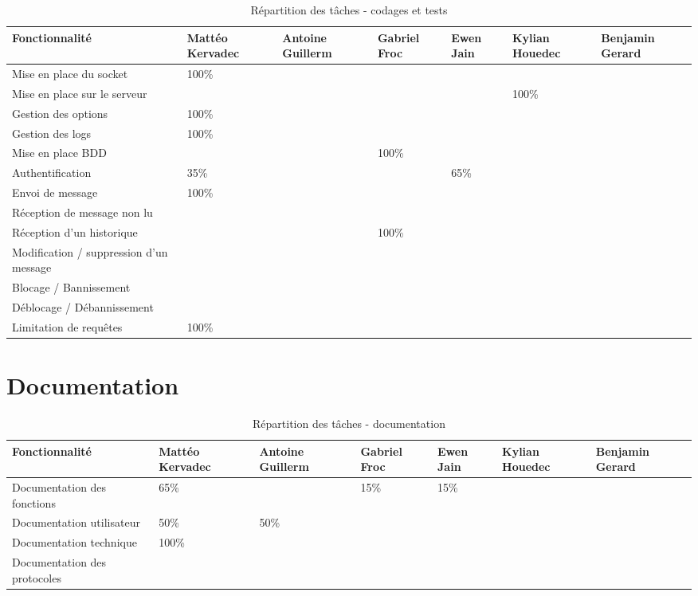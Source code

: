 \documentclass{report}
\begin{document}
\begin{table}[ht]
\hspace{-1cm}  %
\begin{tabular}{|p{3cm}|p{2cm}|p{2cm}|p{2cm}|p{2cm}|p{2cm}|p{2cm}|}
\hline
\textbf{Fonctionnalité} & \textbf{Mattéo Kervadec} & \textbf{Antoine Guillerm} & \textbf{Gabriel Froc} & \textbf{Ewen Jain} & \textbf{Kylian Houedec} & \textbf{Benjamin Gerard} \\
\hline
Mise en place du socket & 100\% & & & & & \\
\hline
Mise en place sur le serveur & & & & & 100\% & \\
\hline
Gestion des options & 100\% & & & & & \\
\hline
Gestion des logs & 100\% & & & & & \\
\hline
Mise en place BDD & & & 100\% & & & \\
\hline
Authentification & 35\% & & & 65\% & & \\
\hline
Envoi de message & 100\% & & & & & \\
\hline
Réception de message non lu & & & & & & \\
\hline
Réception d'un historique & & & 100\% & & & \\
\hline
Modification / suppression d'un message & & & & & & \\
\hline
Blocage / Bannissement & & & & & & \\
\hline
Déblocage / Débannissement &  & & & & & \\
\hline
Limitation de requêtes & 100\% & & & & & \\
\hline
\end{tabular}
\caption{Répartition des tâches - codages et tests}
\end{table}

\chapter{Documentation}

\begin{table}[ht]
\hspace{-1cm}  %
\begin{tabular}{|p{3cm}|p{2cm}|p{2cm}|p{2cm}|p{2cm}|p{2cm}|p{2cm}|}
\hline
\textbf{Fonctionnalité} & \textbf{Mattéo Kervadec} & \textbf{Antoine Guillerm} & \textbf{Gabriel Froc} & \textbf{Ewen Jain} & \textbf{Kylian Houedec} & \textbf{Benjamin Gerard} \\
\hline
Documentation des fonctions & 65\% & & 15\% & 15\% & & \\
\hline
Documentation utilisateur & 50\% & 50\% & & & & \\
\hline
Documentation technique & 100\% & & & & & \\
\hline
Documentation des protocoles & & & & & & \\
\hline
\end{tabular}
\caption{Répartition des tâches - documentation}
\end{table}
\end{document}
